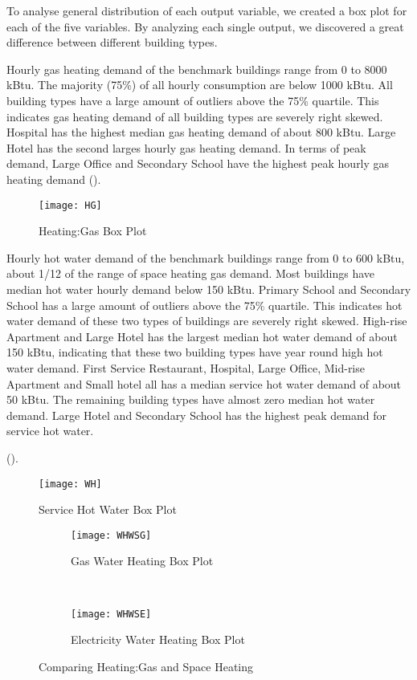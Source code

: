 To analyse general distribution of each output variable, we created a
box plot for each of the five variables. By analyzing each single
output, we discovered a great difference between different building
types. 

Hourly gas heating demand of the benchmark buildings range from 0 to
8000 kBtu. The majority (75\%) of all hourly consumption are below
1000 kBtu. All building types have a large amount of outliers above
the 75\% quartile. This indicates gas heating demand of all building
types are severely right skewed. Hospital has the highest median gas
heating demand of about 800 kBtu. Large Hotel has the second larges
hourly gas heating demand. In terms of peak demand, Large Office and
Secondary School have the highest peak hourly gas heating demand
().
\begin{figure}[h!]
  \centering
  \texttt{[image: HG]}
  \caption[Heating:Gas Box Plot]{Heating:Gas Box Plot}
  \label{fig:HG}
\end{figure}%

Hourly hot water demand of the benchmark buildings range from 0 to 600
kBtu, about 1/12 of the range of space heating gas demand. Most
buildings have median hot water hourly demand below 150 kBtu. Primary
School and Secondary School has a large amount of outliers above the
75\% quartile. This indicates hot water demand of these two types of
buildings are severely right skewed. High-rise Apartment and Large
Hotel has the largest median hot water demand of about 150 kBtu,
indicating that these two building types have year round high hot
water demand. First Service Restaurant, Hospital, Large Office,
Mid-rise Apartment and Small hotel all has a median service hot water
demand of about 50 kBtu. The remaining building types have almost zero
median hot water demand. Large Hotel and Secondary School has the
highest peak demand for service hot water.

 ().
\begin{figure}[h!]
  \centering
  \texttt{[image: WH]}
  \caption[Service Hot Water Box Plot]{Service Hot Water Box Plot}
  \label{fig:WH}
\end{figure}%

\begin{figure}[h!]
  \centering
  \begin{subfigure}{0.4\textwidth}
  \centering
  \texttt{[image: WHWSG]}
  \caption[Gas Water Heating Box Plot]{Gas Water Heating Box Plot}
  \label{fig:WHWSG}
\end{subfigure}
~
\begin{subfigure}{0.4\textwidth}
  \centering
  \texttt{[image: WHWSE]}
  \caption[Electricity Water Heating Box Plot]{Electricity Water Heating Box Plot}
\end{subfigure}
\caption[Comparing Heating:Gas and Space Heating]{Comparing
  Heating:Gas and Space Heating}
\end{figure}

